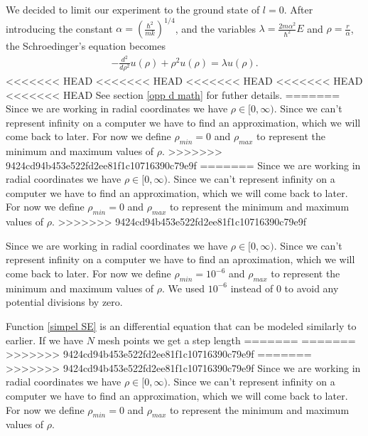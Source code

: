 \documentclass[a4paper]{article}
\begin{document}
We decided to limit our experiment to the ground state of $l=0$. After introducing the constant $\alpha = \left(\frac{\hbar^2}{mk}\right)^{1/4}$, and the variables $\lambda = \frac{2m\alpha^2}{\hbar^2}E$ and $\rho = \frac{r}{\alpha}$, the Schroedinger’s equation becomes
\begin{align}
-\frac{d^2}{d\rho^2} u(\rho) + \rho^2 u(\rho) = \lambda u(\rho). \label{simpel SE}
\end{align}
<<<<<<< HEAD
<<<<<<< HEAD
<<<<<<< HEAD
<<<<<<< HEAD
<<<<<<< HEAD
See section \ref{opp d math} for futher details. 
=======
Since we are working in radial coordinates we have $\rho \in [0,\infty)$. Since we can't represent infinity on a computer we have to find an approximation, which we will come back to later. For now we define $\rho_{min}=0$ and $\rho_{max}$ to represent the  minimum and maximum values of $\rho$. 
>>>>>>> 9424cd94b453e522fd2ee81f1c10716390c79e9f
=======
Since we are working in radial coordinates we have $\rho \in [0,\infty)$. Since we can't represent infinity on a computer we have to find an approximation, which we will come back to later. For now we define $\rho_{min}=0$ and $\rho_{max}$ to represent the  minimum and maximum values of $\rho$. 
>>>>>>> 9424cd94b453e522fd2ee81f1c10716390c79e9f

Since we are working in radial coordinates we have $\rho \in [0,\infty)$. Since we can't represent infinity on a computer we have to find an aproximation, which we will come back to later. For now we define $\rho_{min}=10^{-6}$ and $\rho_{max}$ to represent the  minimum and maximum values of $\rho$. We used $10^{-6}$ instead of $0$ to avoid any potential divisions by zero.

Function \ref{simpel SE} is an differential equation that can be modeled similarly to earlier. If we have $N$ mesh points we get a step length
=======
=======
>>>>>>> 9424cd94b453e522fd2ee81f1c10716390c79e9f
=======
>>>>>>> 9424cd94b453e522fd2ee81f1c10716390c79e9f
Since we are working in radial coordinates we have $\rho \in [0,\infty)$. Since we can't represent infinity on a computer we have to find an approximation, which we will come back to later. For now we define $\rho_{min}=0$ and $\rho_{max}$ to represent the  minimum and maximum values of $\rho$. 
\end{document}
